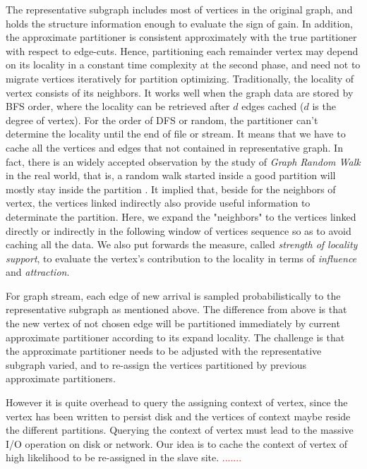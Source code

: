 \documentclass{sig-alternate-2013}
\begin{document}
The representative subgraph includes most of vertices in the original graph, and holds the structure information enough to evaluate the sign of gain. In addition, the approximate partitioner is consistent approximately with the true partitioner with respect to edge-cuts. Hence, partitioning each remainder vertex may depend on its locality in a constant time complexity at the second phase, and need not to migrate vertices iteratively for partition optimizing. Traditionally, the locality of vertex consists of its neighbors. It works well when the graph data are stored by BFS order, where the locality can be retrieved after $d$ edges cached ($d$ is the degree of vertex). For the order of DFS or random, the partitioner can't determine the locality until the end of file or stream. It means that we have to cache all the vertices and edges that not contained in representative graph. In fact, there is an widely accepted observation by the study of \textit{Graph Random Walk} in the real world, that is, a random walk started inside a good partition will mostly stay inside the partition \cite{DBLP:books/sp/social11}. It implied that, beside for the neighbors of vertex, the vertices linked indirectly also provide useful information to determinate the partition. Here, we expand the "neighbors" to the vertices linked directly or indirectly in the following window of vertices sequence so as to avoid caching all the data. We also put forwards the measure, called \textit{strength of locality support}, to evaluate the vertex's contribution to the locality in terms of \textit{influence} and \textit{attraction}.

For graph stream, each edge of new arrival is sampled probabilistically to the representative subgraph as mentioned above. The difference from above is that the new vertex of not chosen edge will be  partitioned immediately by current approximate partitioner according to its expand locality. The challenge is that the approximate partitioner needs to be adjusted with the representative subgraph varied, and to re-assign the vertices partitioned by previous approximate partitioners.

However it is quite overhead to query the assigning context of vertex, since the vertex has been written to persist disk and the vertices of context maybe reside the different partitions. Querying the context of vertex must lead to the massive I/O operation on disk or network. Our idea is to cache the context of vertex of high likelihood to be re-assigned in the slave site.
\textcolor{red}{.......}
\end{document}
